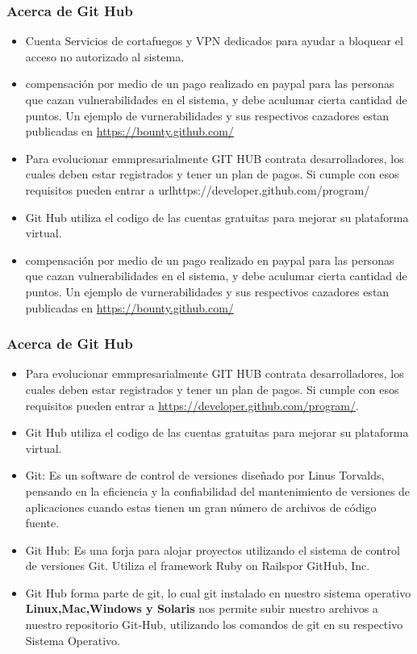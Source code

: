 \documentclass[8pt]{beamer}
\begin{document}
\begin{frame}
\frametitle{Acerca de Git Hub}
\begin{itemize}
\justifying
\item {Cuenta Servicios de cortafuegos y VPN dedicados para ayudar a bloquear el acceso no autorizado al sistema.}
\justifying
\item{compensación por medio de un pago realizado en paypal para las personas que cazan vulnerabilidades en el sistema, y debe aculumar cierta cantidad de puntos. Un ejemplo de vurnerabilidades y sus respectivos  cazadores estan publicadas en \url{https://bounty.github.com/}  }
\justifying
\item {Para  evolucionar emmpresarialmente GIT HUB contrata desarrolladores, los cuales deben estar registrados y tener un plan de pagos. Si cumple con esos requisitos pueden entrar a url{https://developer.github.com/program/}}
\justifying
\item {Git Hub utiliza el codigo de las cuentas  gratuitas para mejorar su plataforma virtual.}
\justifying
\item{compensación por medio de un pago realizado en paypal para las personas que cazan vulnerabilidades en el sistema, y debe aculumar cierta cantidad de puntos. Un ejemplo de vurnerabilidades y sus respectivos  cazadores estan publicadas en \url{https://bounty.github.com/}  }
\end{itemize}
\end{frame}

\begin{frame}
\frametitle{Acerca de Git Hub}
\begin{itemize}

\justifying
\item {Para  evolucionar emmpresarialmente GIT HUB contrata desarrolladores, los cuales deben estar registrados y tener un plan de pagos. Si cumple con esos requisitos pueden entrar a \url{https://developer.github.com/program/}.}
\justifying
\item {Git Hub utiliza el codigo de las cuentas  gratuitas para mejorar su plataforma virtual.}
\justifying
\item{Git: Es un software de control de versiones diseñado por Linus Torvalds, pensando en la eficiencia y la confiabilidad del mantenimiento de versiones de aplicaciones cuando estas tienen un gran número de archivos de código fuente.}
\justifying  
\item{Git Hub: Es una forja para alojar proyectos utilizando el sistema de control de versiones Git. Utiliza el framework Ruby on Railspor GitHub, Inc. }
\justifying
\item {Git Hub forma parte de git, lo cual git instalado en nuestro sistema operativo \textbf{Linux,Mac,Windows y Solaris} nos permite subir nuestro archivos a nuestro repositorio Git-Hub, utilizando los comandos de git en su respectivo Sistema Operativo. }
\end{itemize}
\end{frame}
\end{document}
